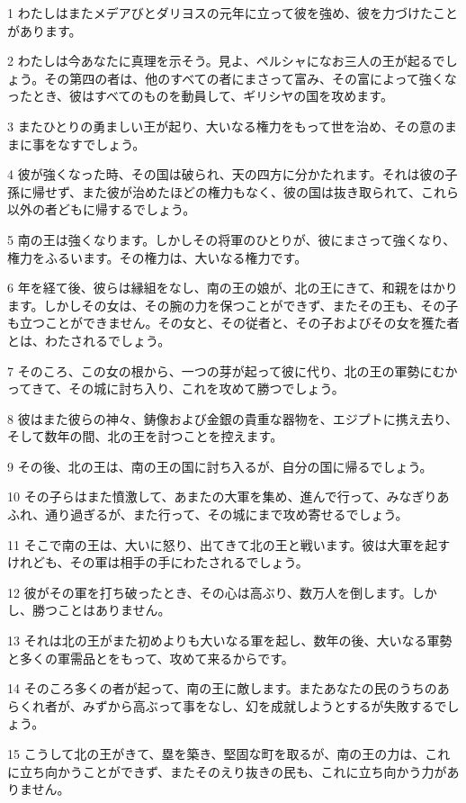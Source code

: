 \par 1 わたしはまたメデアびとダリヨスの元年に立って彼を強め、彼を力づけたことがあります。
\par 2 わたしは今あなたに真理を示そう。見よ、ペルシャになお三人の王が起るでしょう。その第四の者は、他のすべての者にまさって富み、その富によって強くなったとき、彼はすべてのものを動員して、ギリシヤの国を攻めます。
\par 3 またひとりの勇ましい王が起り、大いなる権力をもって世を治め、その意のままに事をなすでしょう。
\par 4 彼が強くなった時、その国は破られ、天の四方に分かたれます。それは彼の子孫に帰せず、また彼が治めたほどの権力もなく、彼の国は抜き取られて、これら以外の者どもに帰するでしょう。
\par 5 南の王は強くなります。しかしその将軍のひとりが、彼にまさって強くなり、権力をふるいます。その権力は、大いなる権力です。
\par 6 年を経て後、彼らは縁組をなし、南の王の娘が、北の王にきて、和親をはかります。しかしその女は、その腕の力を保つことができず、またその王も、その子も立つことができません。その女と、その従者と、その子およびその女を獲た者とは、わたされるでしょう。
\par 7 そのころ、この女の根から、一つの芽が起って彼に代り、北の王の軍勢にむかってきて、その城に討ち入り、これを攻めて勝つでしょう。
\par 8 彼はまた彼らの神々、鋳像および金銀の貴重な器物を、エジプトに携え去り、そして数年の間、北の王を討つことを控えます。
\par 9 その後、北の王は、南の王の国に討ち入るが、自分の国に帰るでしょう。
\par 10 その子らはまた憤激して、あまたの大軍を集め、進んで行って、みなぎりあふれ、通り過ぎるが、また行って、その城にまで攻め寄せるでしょう。
\par 11 そこで南の王は、大いに怒り、出てきて北の王と戦います。彼は大軍を起すけれども、その軍は相手の手にわたされるでしょう。
\par 12 彼がその軍を打ち破ったとき、その心は高ぶり、数万人を倒します。しかし、勝つことはありません。
\par 13 それは北の王がまた初めよりも大いなる軍を起し、数年の後、大いなる軍勢と多くの軍需品とをもって、攻めて来るからです。
\par 14 そのころ多くの者が起って、南の王に敵します。またあなたの民のうちのあらくれ者が、みずから高ぶって事をなし、幻を成就しようとするが失敗するでしょう。
\par 15 こうして北の王がきて、塁を築き、堅固な町を取るが、南の王の力は、これに立ち向かうことができず、またそのえり抜きの民も、これに立ち向かう力がありません。
